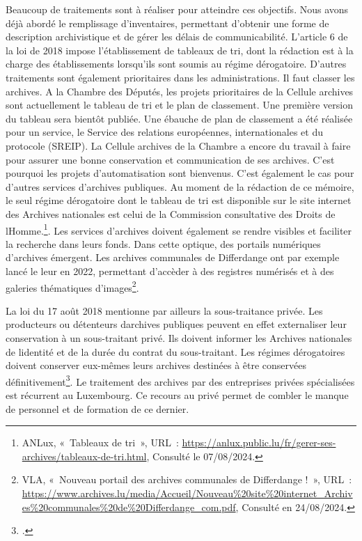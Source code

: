 Beaucoup de
traitements sont à réaliser pour atteindre ces objectifs. Nous avons
déjà abordé le remplissage d'inventaires, permettant d'obtenir une forme
de description archivistique et de gérer les délais de communicabilité.
L'article 6 de la loi de 2018 impose l'établissement de tableaux de tri,
dont la rédaction est à la charge des établissements lorsqu'ils sont
soumis au régime dérogatoire. D'autres traitements sont également
prioritaires dans les administrations. Il faut classer les archives. A
la Chambre des Députés, les projets prioritaires de la Cellule archives sont
actuellement le tableau de tri et le plan de classement. Une première
version du tableau sera bientôt publiée. Une ébauche de plan de
classement a été réalisée pour un service, le Service des relations
européennes, internationales et du protocole (SREIP). La Cellule
archives de la Chambre a encore du travail à faire pour assurer une
bonne conservation et communication de ses archives. C'est pourquoi
les projets d'automatisation sont bienvenus. C'est également le cas pour
d'autres services d'archives publiques. Au moment de la rédaction de ce
mémoire, le seul régime dérogatoire dont le tableau de tri est
disponible sur le site internet des Archives nationales est celui de la
Commission consultative des Droits de
l\textquotesingle Homme.\footnote{ANLux, «~Tableaux de tri~», URL~:
	\url{https://anlux.public.lu/fr/gerer-ses-archives/tableaux-de-tri.html},
	Consulté le 07/08/2024.}. Les services d'archives doivent également se rendre visibles et faciliter la recherche dans leurs fonds. Dans cette optique, des portails numériques d'archives émergent. Les archives communales de Differdange ont par exemple lancé le leur en 2022, permettant d'accèder à des registres numérisés et à des galeries thématiques d'images\footnote{VLA,
	 «~Nouveau portail des archives communales de Differdange !~»,	URL~: \url{https://www.archives.lu/media/Accueil/Nouveau\%20site\%20internet_Archives\%20communales\%20de\%20Differdange_com.pdf},
	Consulté en 24/08/2024.}.
\newline

La loi du 17 août 2018 mentionne par ailleurs la sous-traitance privée. Les
producteurs ou détenteurs d\textquotesingle archives publiques peuvent
en effet externaliser leur conservation à un sous-traitant privé. Ils
doivent informer les Archives nationales de l\textquotesingle identité
et de la durée du contrat du sous-traitant. Les régimes dérogatoires
doivent conserver eux-mêmes leurs archives destinées à être conservées
définitivement\footcite{loi_2018}. Le traitement des
archives par des entreprises privées spécialisées est récurrent au
Luxembourg. Ce recours au privé permet de combler le manque de
personnel et de formation de ce dernier. 

